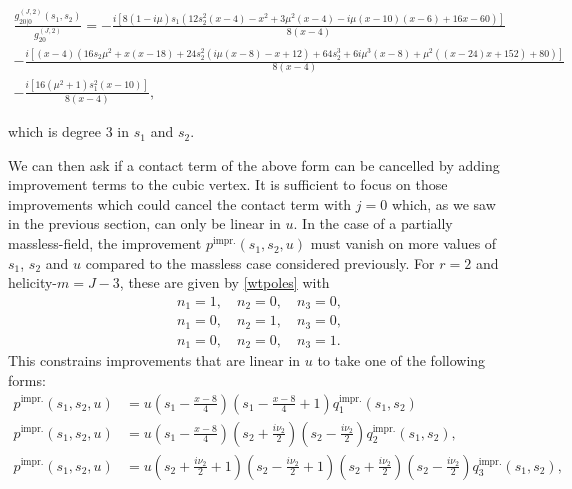 \documentclass[11pt,a4paper]{article}
\begin{document}
{\footnotesize\begin{multline}\label{obspm}
  \frac{g^{\left(J,2\right)}_{20|0}(s_1,s_2)}{g^{\left(J,2\right)}_{20}} =  -\frac{i \left[8 (1-i \mu ) s_1 \left(12 s^2_2 (x-4)-x^2+3 \mu ^2 (x-4)-i \mu  (x-10) (x-6)+16 x-60\right)\right]}{8 (x-4)}\\
    -\frac{i \left[(x-4) \left(16 s_2 \mu^2+x \left(x-18\right)+24 s^2_2 (i \mu  (x-8)-x+12)+64 s^3_2+6 i \mu ^3 (x-8)+\mu ^2 ((x-24) x+152)+80\right)\right]}{8 (x-4)}\\
    -\frac{i \left[16 \left(\mu ^2+1\right) s^2_1 (x-10)\right]}{8 (x-4)},
\end{multline}}

\noindent which is degree 3 in $s_1$ and $s_2$. 

We can then ask if a contact term of the above form can be cancelled by adding improvement terms to the cubic vertex. It is sufficient to focus on those improvements which could cancel the contact term with $j=0$ which, as we saw in the previous section, can only be linear in $u$. In the case of a partially massless-field, the improvement  $p^{\text{impr.}}\left(s_1,s_2,u\right)$ must vanish on more values of $s_1$, $s_2$ and $u$ compared to the massless case considered previously. For $r=2$ and helicity-$m=J-3$, these are given by \eqref{wtpoles} with
\begin{subequations}
\begin{align}
    n_1=1, \quad n_2=0, \quad n_3=0,\\
    n_1=0, \quad n_2=1, \quad n_3=0,\\
    n_1=0, \quad n_2=0, \quad n_3=1.
\end{align}
\end{subequations}
This constrains improvements that are linear in $u$ to take one of the following forms:
\begin{subequations}
\begin{align}
    p^{\text{impr.}}\left(s_1,s_2,u\right)&=u\left(s_1-\tfrac{x-8}{4}\right)\left(s_1-\tfrac{x-8}{4}+1\right)q^{\text{impr.}}_1\left(s_1,s_2\right)\label{impq1}\\\label{impq2}
    p^{\text{impr.}}\left(s_1,s_2,u\right)&=u\left(s_1-\tfrac{x-8}{4}\right)\left(s_2+ \tfrac{i\nu_2}{2}\right)\left(s_2- \tfrac{i\nu_2}{2}\right)q^{\text{impr.}}_2\left(s_1,s_2\right),\\
     p^{\text{impr.}}\left(s_1,s_2,u\right) &=u\left(s_2+ \tfrac{i\nu_2}{2}+1\right)\left(s_2- \tfrac{i\nu_2}{2}+1\right)\left(s_2+ \tfrac{i\nu_2}{2}\right)\left(s_2- \tfrac{i\nu_2}{2}\right)q^{\text{impr.}}_3\left(s_1,s_2\right),\label{impq3}
\end{align}
\end{subequations}
\end{document}
